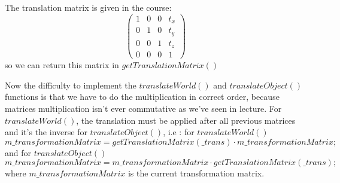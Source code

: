 \documentclass[10pt,a4paper]{report}
\begin{document}
The translation matrix is given in the course: 
\[ \left( \begin{array}{cccc}
1 & 0 & 0 & t_x\\
0 & 1 & 0 & t_y\\
0 & 0 & 1 & t_z\\
0 & 0 & 0 & 1\end{array} \right)\] 
so we can return this matrix in $getTranslationMatrix()$

Now the difficulty to implement the $translateWorld()$ and $translateObject()$ functions is that we have to do the multiplication in correct order, because matrices multiplication isn't ever commutative as we've seen in lecture.
For $translateWorld()$, the translation must be applied after all previous matrices and it's the inverse for $translateObject()$, i.e :
for $translateWorld()$
$$m\_transformationMatrix = getTranslationMatrix(\_trans) \cdot m\_transformationMatrix;$$
and for $translateObject()$
$$m\_transformationMatrix = m\_transformationMatrix \cdot getTranslationMatrix(\_trans);$$
where $m\_transformationMatrix$ is the current transformation matrix.
\end{document}
